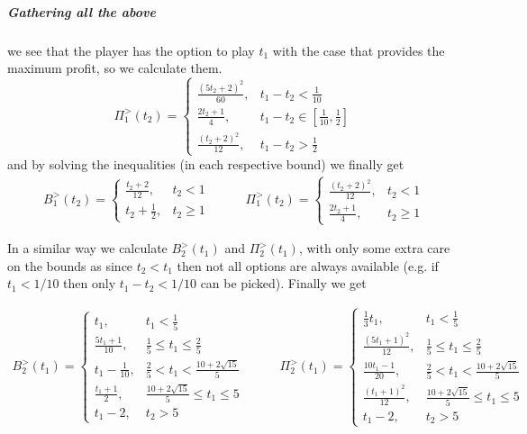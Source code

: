 \documentclass[10pt,a4paper]{book}
\theoremstyle{definition}
\theoremstyle{comment}
\begin{document}
\subparagraph{Gathering all the above} we see that the player has the option to play $t_1$ with the case that provides the maximum profit, so we calculate them.
\[
	\Pi_1^>(t_2) =
	\begin{cases}
		\frac{(5 t_2 + 2)^2}{60}, & t_1 - t_2 < \frac1{10} \\
		\frac{2 t_2 + 1}4, & t_1 - t_2 \in \left[\frac1{10}, \frac12\right] \\
		\frac{(t_2 + 2)^2}{12}, & t_1 - t_2 > \frac12
	\end{cases}
\]
and by solving the inequalities (in each respective bound) we finally get
\begin{equation*}
	\begin{aligned}
		B_1^>(t_2) =
		\begin{cases}
			\frac{t_2 + 2}{12}, & t_2 < 1 \\
			t_2 + \frac12, & t_2 \ge 1
		\end{cases}
	\end{aligned}
	\qquad
	\begin{aligned}
		\Pi_1^>(t_2) =
		\begin{cases}
			\frac{(t_2 + 2)^2}{12}, & t_2 < 1 \\
			\frac{2 t_2 + 1}4, & t_2 \ge 1
		\end{cases}
	\end{aligned}
\end{equation*}

In a similar way we calculate $B_2^>(t_1)$ and $\Pi_2^>(t_1)$, with only some extra care on the bounds as since $t_2 < t_1$ then not all options are always available (e.g. if $t_1 < 1/10$ then only $t_1 - t_2 < 1/10$ can be picked).
Finally we get

\begin{equation*}
	\begin{aligned}
		B_2^>(t_1) =
		\begin{cases}
			t_1, & t_1 < \frac15 \\
			\frac{5 t_1 + 1}{10}, & \frac15 \le t_1 \le \frac25 \\
			t_1 - \frac1{10}, & \frac25 < t_1 < \frac{10 + 2 \sqrt{15}}5 \\
			\frac{t_1 + 1}2, & \frac{10 + 2 \sqrt{15}}5 \le t_1 \le 5 \\
			t_1 - 2, & t_2 > 5
		\end{cases}
	\end{aligned}
	\qquad
	\begin{aligned}
		\Pi_2^>(t_1) =
		\begin{cases}
			\frac13 t_1, & t_1 < \frac15 \\
			\frac{(5 t_1 + 1)^2}{12}, & \frac15 \le t_1 \le \frac25 \\
			\frac{10 t_1 - 1}{20}, & \frac25 < t_1 < \frac{10 + 2 \sqrt{15}}5 \\
			\frac{(t_1 + 1)^2}{12}, & \frac{10 + 2 \sqrt{15}}5 \le t_1 \le 5 \\
			t_1 - 2, & t_2 > 5
		\end{cases}
	\end{aligned}
\end{equation*}
\end{document}
